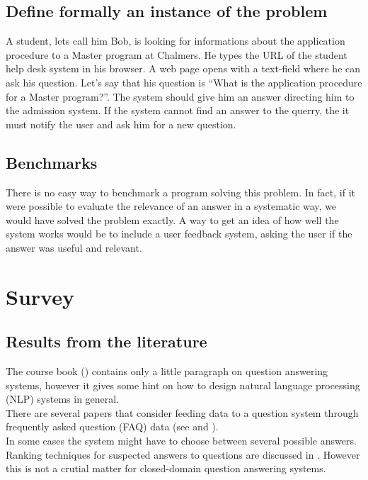 \documentclass[a4paper,11pt]{article}
\begin{document}
\subsection{Define formally an instance of the problem}
A student, lets call him Bob, is looking for informations about the application
procedure to a Master program at Chalmers. He types the URL of the student help
desk system in his browser. A web page opens with a text-field where he can ask
his question. Let's say that his question is ``What is the application procedure
for a Master program?''. The system should give him an answer directing him to
the admission system. If the system cannot find an answer to the querry, the it
must notify the user and ask him for a new question.

\subsection{Benchmarks}
There is no easy way to benchmark a program solving this problem. In fact, if it
were possible to evaluate the relevance of an answer in a systematic way, we would
have solved the problem exactly. A way to get an idea of how well the system works
would be to include a user feedback system, asking the user if the answer was
useful and relevant.

\section{Survey}
\subsection{Results from the literature}
The course book (\cite{aimodern}) contains only a little paragraph on question
answering systems, however it gives some hint on how to design natural language
processing (NLP) systems in general.\\
There are several papers that consider feeding data to a question system through
frequently asked question (FAQ) data (see \cite{evaluatingqasusingfaq} and
\cite{faqfindersys}).\\
In some cases the system might have to choose between several possible answers.
Ranking techniques for suspected answers to questions are discussed in
\cite{rankingsuspected}. However this is not a crutial matter for closed-domain
question answering systems.\\
\end{document}

